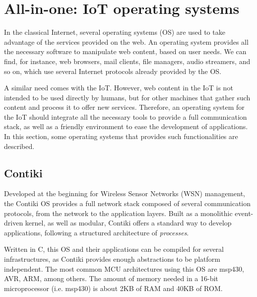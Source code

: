 \section{All-in-one: IoT operating systems}
In the classical Internet, several operating systems (OS) are used to take advantage of the services provided on the web.
An operating system provides all the necessary software to manipulate web content, based on user needs.
We can find, for instance, web browsers, mail clients, file managers, audio streamers, and so on, which use several Internet protocols already provided by the OS.

A similar need comes with the IoT.
However, web content in the IoT is not intended to be used directly by humans, but for other machines that gather such content and process it to offer new services.
Therefore, an operating system for the IoT should integrate all the necessary tools to provide a full communication stack, as well as a friendly environment to ease the development of applications.
In this section, some operating systems that provides such functionalities are described.

\subsection{Contiki}
Developed at the beginning for Wireless Sensor Networks (WSN) management, the Contiki OS\cite{dunkels2004contiki} provides a full network stack composed of several communication protocols, from the network to the application layers.
Built as a monolithic event-driven kernel, as well as modular, Contiki offers a standard way to develop applications, following a structured architecture of \textit{processes}.

Written in C, this OS and their applications can be compiled for several infrastructures, as Contiki provides enough abstractions to be platform independent.
The most common MCU architectures using this OS are msp430, AVR, ARM, among others.
The amount of memory needed in a 16-bit microprocessor (i.e. msp430) is about 2KB of RAM and 40KB of ROM.

